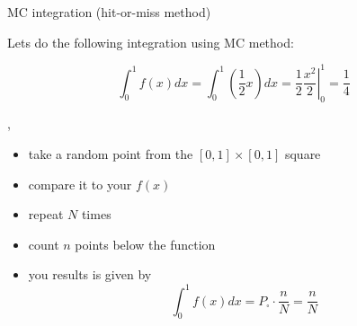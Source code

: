 \begin{slide}[toc=Hit-or-miss method]{MC integration (hit-or-miss method)}
\null\vfill

  Lets do the following integration using MC method:
  
  $$\int_0^1 f(x)dx = \int_0^1 \left(\frac{1}{2}x\right) dx = \left.\frac{1}{2}\frac{x^2}{2}\right|_{0}^{1} = \frac{1}{4}$$

  \twocolumn
  {
    \sep
    \begin{itemize}
     \item take a random point from the $[0,1]\times[0,1]$ square
     \item compare it to your $f(x)$
     \item repeat $N$ times
     \item count $n$ points below the function
     \item you results is given by
     $$\int_0^1 f(x)dx = P_{\square} \cdot \frac{n}{N} = \frac{n}{N}$$
    \end{itemize}
  }
  {
    
  }
  
\vfill\null
\end{slide}

